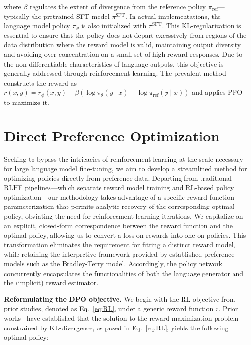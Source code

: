 where $\beta$ regulates the extent of divergence from the reference policy $\pi_\text{ref}$—typically the pretrained SFT model $\pi^\text{SFT}$. In actual implementations, the language model policy $\pi_\theta$ is also initialized with $\pi^\text{SFT}$. This KL-regularization is essential to ensure that the policy does not depart excessively from regions of the data distribution where the reward model is valid, maintaining output diversity and avoiding over-concentration on a small set of high-reward responses. Due to the non-differentiable characteristics of language outputs, this objective is generally addressed through reinforcement learning. The prevalent method \citep{ziegler2020finetuning, stiennon2022learning, bai2022training, ouyang2022training} constructs the reward as ${r(x, y) = r_{\phi}(x, y) -\beta (\log \pi_{\theta}(y\mid x) - \log \pi_\text{ref}(y\mid x))}$ and applies PPO \cite{schulman2017proximal} to maximize it.

\section{Direct Preference Optimization}\label{sec:DPO}

Seeking to bypass the intricacies of reinforcement learning at the scale necessary for large language model fine-tuning, we aim to develop a streamlined method for optimizing policies directly from preference data. Departing from traditional RLHF pipelines—which separate reward model training and RL-based policy optimization—our methodology takes advantage of a specific reward function parameterization that permits analytic recovery of the corresponding optimal policy, obviating the need for reinforcement learning iterations. We capitalize on an explicit, closed-form correspondence between the reward function and the optimal policy, allowing us to convert a loss on rewards into one on policies. This transformation eliminates the requirement for fitting a distinct reward model, while retaining the interpretive framework provided by established preference models such as the Bradley-Terry model. Accordingly, the policy network concurrently encapsulates the functionalities of both the language generator and the (implicit) reward estimator.

\textbf{Reformulating the DPO objective.} We begin with the RL objective from prior studies, denoted as Eq.~\ref{eq:RL}, under a generic reward function $r$. Prior works~\citep{peters2007reinforcement, peng2019advantage, korbak2022reinforcement, go2023aligning} have established that the solution to the reward maximization problem constrained by KL-divergence, as posed in Eq.~\ref{eq:RL}, yields the following optimal policy:

